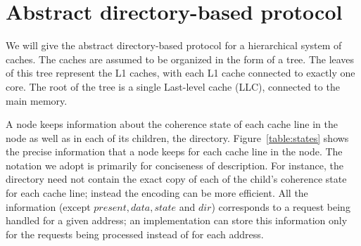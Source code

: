 \section{Abstract directory-based protocol}

\label{sec:abstract}

\newcommand{\One}[2]{\text{#1$\langle#2\rangle$}}
\newcommand{\qOne}[2]{\text{#1[$#2$]}}
\newcommand{\qTwo}[3]{\text{#1[$#2$][$#3$}}
\newcommand{\two}[3]{\text{#1$\langle#2,#3\rangle$}}
\newcommand{\three}[4]{\text{#1$\langle#2,#3,#4\rangle$}}
\newcommand{\four}[5]{\text{#1$\langle#2,#3,#4,#5\rangle$}}
\newcommand{\True}{\texttt{True}}
\newcommand{\False}{\texttt{False}}
\newcommand{\assigns}{:=}
\newcommand{\AndAnd}{\;\&\&\;}
\newcommand{\OrOr}{\;||\;}
\newcommand{\Inv}{\text{$Inv$}\;}


We will give the abstract directory-based protocol for a hierarchical system of
caches. The caches are assumed to be organized in the form of a tree. The leaves
of this tree represent the L1 caches, with each L1 cache connected to exactly
one core. The root of the tree is a single Last-level cache (LLC), connected to
the main memory.

A node keeps information about the coherence state of each cache line in the
node as well as in each of its children, \ie the directory.
Figure~\ref{table:states} shows the precise information that a node keeps for
each cache line in the node. The notation we adopt is primarily for conciseness
of description. For instance, the directory need not contain the exact copy of
each of the child's coherence state for each cache line; instead the encoding
can be more efficient. All the information (except $present, data, state$ and
$dir$) corresponds to a request being handled for a given address; an
implementation can store this information only for the requests being processed
instead of for each address.

